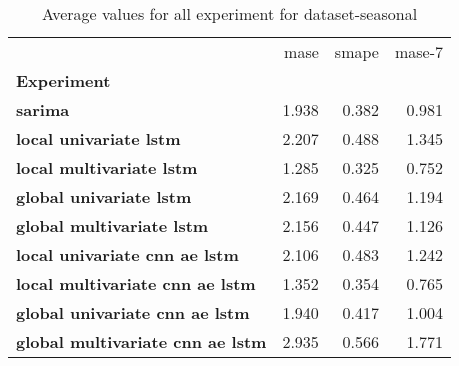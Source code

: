 \begin{table}[h]
\centering
\caption{Average values for all experiment for dataset-seasonal}
\label{table:Average-metric-dataset-seasonal}
\begin{tabular}{lrrr}
\toprule
{} &   mase &  smape &  mase-7 \\
\textbf{Experiment                     } &        &        &         \\
\midrule
\textbf{sarima                         } &  1.938 &  0.382 &   0.981 \\
\textbf{local univariate lstm          } &  2.207 &  0.488 &   1.345 \\
\textbf{local multivariate lstm        } &  1.285 &  0.325 &   0.752 \\
\textbf{global univariate lstm         } &  2.169 &  0.464 &   1.194 \\
\textbf{global multivariate lstm       } &  2.156 &  0.447 &   1.126 \\
\textbf{local univariate cnn ae lstm   } &  2.106 &  0.483 &   1.242 \\
\textbf{local multivariate cnn ae lstm } &  1.352 &  0.354 &   0.765 \\
\textbf{global univariate cnn ae lstm  } &  1.940 &  0.417 &   1.004 \\
\textbf{global multivariate cnn ae lstm} &  2.935 &  0.566 &   1.771 \\
\bottomrule
\end{tabular}
\end{table}
